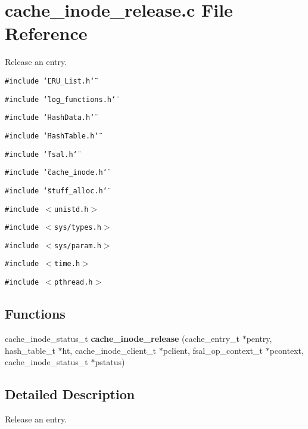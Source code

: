 \section{cache\_\-inode\_\-release.c File Reference}
\label{cache__inode__release_8c}
Release an entry. 

{\tt \#include \char`\"{}LRU\_\-List.h\char`\"{}}\par
{\tt \#include \char`\"{}log\_\-functions.h\char`\"{}}\par
{\tt \#include \char`\"{}Hash\-Data.h\char`\"{}}\par
{\tt \#include \char`\"{}Hash\-Table.h\char`\"{}}\par
{\tt \#include \char`\"{}fsal.h\char`\"{}}\par
{\tt \#include \char`\"{}cache\_\-inode.h\char`\"{}}\par
{\tt \#include \char`\"{}stuff\_\-alloc.h\char`\"{}}\par
{\tt \#include $<$unistd.h$>$}\par
{\tt \#include $<$sys/types.h$>$}\par
{\tt \#include $<$sys/param.h$>$}\par
{\tt \#include $<$time.h$>$}\par
{\tt \#include $<$pthread.h$>$}\par
\subsection*{Functions}
\begin{CompactItemize}
\item 
cache\_\-inode\_\-status\_\-t {\bf cache\_\-inode\_\-release} (cache\_\-entry\_\-t $\ast$pentry, hash\_\-table\_\-t $\ast$ht, cache\_\-inode\_\-client\_\-t $\ast$pclient, fsal\_\-op\_\-context\_\-t $\ast$pcontext, cache\_\-inode\_\-status\_\-t $\ast$pstatus)
\end{CompactItemize}


\subsection{Detailed Description}
Release an entry. 

